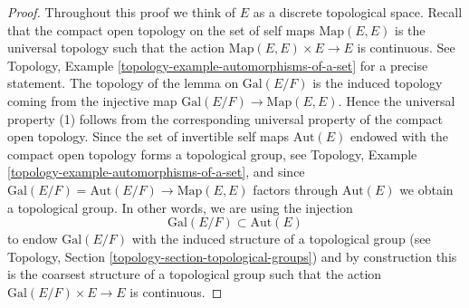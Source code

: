 \documentclass[10pt,a4paper]{amsart}
\theoremstyle{plain}
\theoremstyle{definition}
\theoremstyle{remark}
\numberwithin{equation}{subsection}
\begin{document}
\begin{proof}
Throughout this proof we think of $E$ as a discrete topological space.
Recall that the compact open topology on the set of self maps
$\text{Map}(E, E)$ is the universal topology such that the action
$\text{Map}(E, E) \times E \to E$ is continuous. See
Topology, Example \ref{topology-example-automorphisms-of-a-set}
for a precise statement. The topology of the lemma on
$\text{Gal}(E/F)$ is the induced topology coming from the
injective map $\text{Gal}(E/F) \to \text{Map}(E, E)$.
Hence the universal property (1) follows from the corresponding
universal property of the compact open topology.
Since the set of invertible self maps $\text{Aut}(E)$
endowed with the compact open topology forms a topological group, see
Topology, Example \ref{topology-example-automorphisms-of-a-set},
and since $\text{Gal}(E/F) = \text{Aut}(E/F) \to \text{Map}(E, E)$
factors through $\text{Aut}(E)$ we obtain a topological group.
In other words, we are using the injection
$$
\text{Gal}(E/F) \subset \text{Aut}(E)
$$
to endow $\text{Gal}(E/F)$ with the induced structure of a topological group
(see Topology, Section \ref{topology-section-topological-groups})
and by construction this is the coarsest structure of a topological
group such that the action $\text{Gal}(E/F) \times E \to E$ is continuous.


\end{proof}
\end{document}
